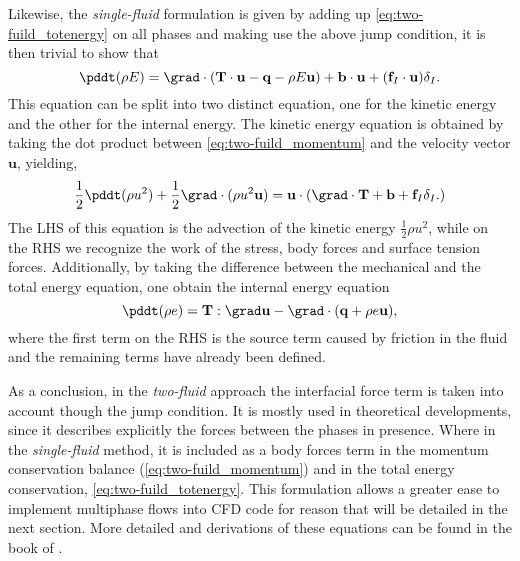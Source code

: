 Likewise, the \textit{single-fluid} formulation is given by adding up \ref{eq:two-fuild_totenergy}
on all phases and making use the above jump condition, it is then trivial to show that
\begin{equation}
    \pddt (\rho E)
    = \grad \cdot \left(
        \textbf{T}\cdot\textbf{u}
        - \textbf{q}
        -\rho E \textbf{u} 
    \right)
    + \textbf{b}\cdot\textbf{u}
    +(\textbf{f}_I\cdot\textbf{u})\delta_I.
    \label{eq:one-fuild_totenergy}
\end{equation}
This equation can be split into two distinct equation, one for the kinetic energy and the other for the internal energy. 
The kinetic energy equation is obtained by taking the dot product between 
\ref{eq:two-fuild_momentum} and the velocity vector $\textbf{u}$, yielding,
\begin{equation}
    \frac{1}{2}\pddt (\rho u^2)
    +\frac{1}{2} \grad \cdot (\rho u^2 \textbf{u})
    =\textbf{u}\cdot\left(
        \grad\cdot\textbf{T}
        +\textbf{b}
        +\textbf{f}_I\delta_I.
    \right)
    \label{eq:one-fuild_meca}
\end{equation}
The LHS of this equation is the advection of the kinetic energy $\frac{1}{2}\rho u^2$, while on the RHS we recognize the work of the stress, body forces and surface tension forces. 
Additionally, by taking the difference between the mechanical and the total energy equation, one 
obtain the internal energy equation \citep{tryggvason2011direct}
\begin{equation}
    \pddt (\rho e)
    = 
    \textbf{T}:\grad\textbf{u}
    - \grad\cdot(\textbf{q} + \rho  e\textbf{u}),
    \label{eq:one-fuild_internal_energy}
\end{equation}
where the first term on the RHS is the source term caused by friction in the fluid and the remaining terms have already been defined. 

As a conclusion, in the \textit{two-fluid} approach the interfacial force term is taken into account though the jump condition. 
It is mostly used in theoretical developments, since it describes explicitly the forces between the phases in presence. 
Where in the \textit{single-fluid} method, it is included as a body forces term in the momentum conservation balance (\ref{eq:two-fuild_momentum}) and in the total energy conservation, \ref{eq:two-fuild_totenergy}. 
This formulation allows a greater ease to implement multiphase flows into CFD code for reason that will be detailed in the next section.
More detailed and derivations of these equations can be found in the book of \citet{morel2015mathematical}. 
